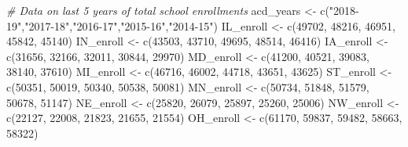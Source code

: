\documentclass[
]{article}
\newenvironment{Shaded}{\begin{snugshade}}{\end{snugshade}}
\newcommand{\CommentTok}[1]{\textcolor[rgb]{0.56,0.35,0.01}{\textit{#1}}}
\newcommand{\DecValTok}[1]{\textcolor[rgb]{0.00,0.00,0.81}{#1}}
\newcommand{\FunctionTok}[1]{\textcolor[rgb]{0.00,0.00,0.00}{#1}}
\newcommand{\NormalTok}[1]{#1}
\newcommand{\OtherTok}[1]{\textcolor[rgb]{0.56,0.35,0.01}{#1}}
\newcommand{\StringTok}[1]{\textcolor[rgb]{0.31,0.60,0.02}{#1}}
\begin{document}
\begin{Shaded}
\begin{Highlighting}[]
\CommentTok{\# Data on last 5 years of total school enrollments}
\NormalTok{acd\_years }\OtherTok{\textless{}{-}} \FunctionTok{c}\NormalTok{(}\StringTok{"2018{-}19"}\NormalTok{,}\StringTok{"2017{-}18"}\NormalTok{,}\StringTok{"2016{-}17"}\NormalTok{,}\StringTok{"2015{-}16"}\NormalTok{,}\StringTok{"2014{-}15"}\NormalTok{)}
\NormalTok{IL\_enroll }\OtherTok{\textless{}{-}} \FunctionTok{c}\NormalTok{(}\DecValTok{49702}\NormalTok{, }\DecValTok{48216}\NormalTok{, }\DecValTok{46951}\NormalTok{, }\DecValTok{45842}\NormalTok{, }\DecValTok{45140}\NormalTok{)}
\NormalTok{IN\_enroll }\OtherTok{\textless{}{-}} \FunctionTok{c}\NormalTok{(}\DecValTok{43503}\NormalTok{, }\DecValTok{43710}\NormalTok{, }\DecValTok{49695}\NormalTok{, }\DecValTok{48514}\NormalTok{, }\DecValTok{46416}\NormalTok{)}
\NormalTok{IA\_enroll }\OtherTok{\textless{}{-}} \FunctionTok{c}\NormalTok{(}\DecValTok{31656}\NormalTok{, }\DecValTok{32166}\NormalTok{, }\DecValTok{32011}\NormalTok{, }\DecValTok{30844}\NormalTok{, }\DecValTok{29970}\NormalTok{)}
\NormalTok{MD\_enroll }\OtherTok{\textless{}{-}} \FunctionTok{c}\NormalTok{(}\DecValTok{41200}\NormalTok{, }\DecValTok{40521}\NormalTok{, }\DecValTok{39083}\NormalTok{, }\DecValTok{38140}\NormalTok{, }\DecValTok{37610}\NormalTok{)}
\NormalTok{MI\_enroll }\OtherTok{\textless{}{-}} \FunctionTok{c}\NormalTok{(}\DecValTok{46716}\NormalTok{, }\DecValTok{46002}\NormalTok{, }\DecValTok{44718}\NormalTok{, }\DecValTok{43651}\NormalTok{, }\DecValTok{43625}\NormalTok{)}
\NormalTok{ST\_enroll }\OtherTok{\textless{}{-}} \FunctionTok{c}\NormalTok{(}\DecValTok{50351}\NormalTok{, }\DecValTok{50019}\NormalTok{, }\DecValTok{50340}\NormalTok{, }\DecValTok{50538}\NormalTok{, }\DecValTok{50081}\NormalTok{)}
\NormalTok{MN\_enroll }\OtherTok{\textless{}{-}} \FunctionTok{c}\NormalTok{(}\DecValTok{50734}\NormalTok{, }\DecValTok{51848}\NormalTok{, }\DecValTok{51579}\NormalTok{, }\DecValTok{50678}\NormalTok{, }\DecValTok{51147}\NormalTok{)}
\NormalTok{NE\_enroll }\OtherTok{\textless{}{-}} \FunctionTok{c}\NormalTok{(}\DecValTok{25820}\NormalTok{, }\DecValTok{26079}\NormalTok{, }\DecValTok{25897}\NormalTok{, }\DecValTok{25260}\NormalTok{, }\DecValTok{25006}\NormalTok{)}
\NormalTok{NW\_enroll }\OtherTok{\textless{}{-}} \FunctionTok{c}\NormalTok{(}\DecValTok{22127}\NormalTok{, }\DecValTok{22008}\NormalTok{, }\DecValTok{21823}\NormalTok{, }\DecValTok{21655}\NormalTok{, }\DecValTok{21554}\NormalTok{)}
\NormalTok{OH\_enroll }\OtherTok{\textless{}{-}} \FunctionTok{c}\NormalTok{(}\DecValTok{61170}\NormalTok{, }\DecValTok{59837}\NormalTok{, }\DecValTok{59482}\NormalTok{, }\DecValTok{58663}\NormalTok{, }\DecValTok{58322}\NormalTok{)}

\end{Highlighting}
\end{Shaded}
\end{document}
